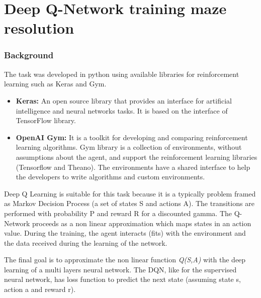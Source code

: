 \chapter{Deep Q-Network training maze resolution}

\subsection{Background}
The task was developed in python using available libraries for reinforcement learning such as Keras and Gym.
\begin{itemize}
    \item \textbf{Keras: }An open source library that provides an interface for artificial intelligence and neural networks tasks. It is based on the interface of TensorFlow library.
    \item \textbf{OpenAI Gym: }It is a toolkit for developing and comparing reinforcement learning algorithms. Gym library is a collection of environments, without assumptions about the agent, and support the reinforcement learning libraries (Tensorflow and Theano). The environments have a shared interface to help the developers to write algorithms and custom environments.
\end{itemize}

Deep Q Learning is suitable for this task because it is a typically problem framed as Markov Decision Process (a set of states S and actions A). The transitions are performed with probability P and reward R for a discounted gamma. 
The Q-Network proceeds as a non linear approximation which maps states in an action value. During the training, the agent interacts (fits) with the environment and the data received during the learning of the network.

The final goal is to approximate the non linear function \textit{Q(S,A)} with the deep learning of a multi layers neural network. The DQN, like for the supervised neural network, has loss function to predict the next state (assuming state s, action a and reward r).

